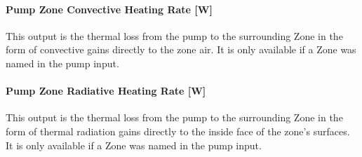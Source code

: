 \paragraph{Pump Zone Convective Heating Rate {[}W{]}}\label{pump-zone-convective-heating-rate-w-4}

This output is the thermal loss from the pump to the surrounding Zone in the form of convective gains directly to the zone air. It is only available if a Zone was named in the pump input.

\paragraph{Pump Zone Radiative Heating Rate {[}W{]}}\label{pump-zone-radiative-heating-rate-w-4}

This output is the thermal loss from the pump to the surrounding Zone in the form of thermal radiation gains directly to the inside face of the zone's surfaces. It is only available if a Zone was named in the pump input.